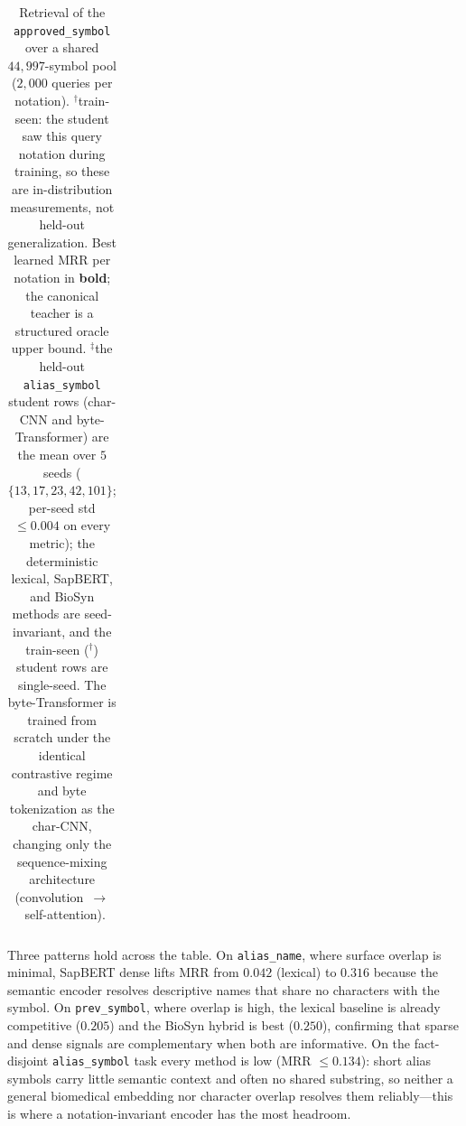 \documentclass[11pt]{article}
\begin{document}
\begin{table}[t]
\begin{tabular}{llccc}
\bottomrule
\end{tabular}
\caption{Retrieval of the \texttt{approved\_symbol} over a shared $44{,}997$-symbol
pool ($2{,}000$ queries per notation). $^{\dagger}$train-seen: the student saw this
query notation during training, so these are in-distribution measurements, not
held-out generalization. Best learned MRR per notation in \textbf{bold}; the
canonical teacher is a structured oracle upper bound.
$^{\ddagger}$the held-out \texttt{alias\_symbol} student rows (char-CNN and
byte-Transformer) are the mean over $5$ seeds ($\{13,17,23,42,101\}$; per-seed std
$\le 0.004$ on every metric); the deterministic lexical, SapBERT, and BioSyn
methods are seed-invariant, and the train-seen ($^{\dagger}$) student rows are
single-seed. The byte-Transformer is trained from scratch under the identical
contrastive regime and byte tokenization as the char-CNN, changing only the
sequence-mixing architecture (convolution~$\rightarrow$~self-attention).}
\label{tab:results}
\end{table}

Three patterns hold across the table. On \texttt{alias\_name}, where surface
overlap is minimal, SapBERT dense lifts MRR from $0.042$ (lexical) to $0.316$
because the semantic encoder resolves descriptive names that share no characters
with the symbol. On \texttt{prev\_symbol}, where overlap is high, the lexical
baseline is already competitive ($0.205$) and the BioSyn hybrid is best ($0.250$),
confirming that sparse and dense signals are complementary when both are
informative. On the fact-disjoint \texttt{alias\_symbol} task every method is low
(MRR $\leq 0.134$): short alias symbols carry little semantic context and often no
shared substring, so neither a general biomedical embedding nor character overlap
resolves them reliably---this is where a notation-invariant encoder has the most
headroom.
\end{document}
